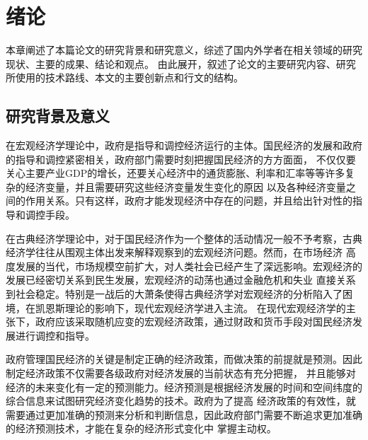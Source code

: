 \section{绪论}
本章阐述了本篇论文的研究背景和研究意义，综述了国内外学者在相关领域的研究现状、主要的成果、结论和观点。
由此展开，叙述了论文的主要研究内容、研究所使用的技术路线、本文的主要创新点和行文的结构。

\subsection{研究背景及意义}
在宏观经济学理论中，政府是指导和调控经济运行的主体。国民经济的发展和政府的指导和调控紧密相关，政府部门需要时刻把握国民经济的方方面面，
不仅仅要关心主要产业GDP的增长，还要关心经济中的通货膨胀、利率和汇率等等许多复杂的经济变量，并且需要研究这些经济变量发生变化的原因
以及各种经济变量之间的作用关系。只有这样，政府才能发现经济中存在的问题，并且给出针对性的指导和调控手段。

在古典经济学理论中，对于国民经济作为一个整体的活动情况一般不予考察，古典经济学往往从围观主体出发来解释观察到的宏观经济问题。然而，在市场经济
高度发展的当代，市场规模空前扩大，对人类社会已经产生了深远影响。宏观经济的发展已经密切关系到民生发展，宏观经济的动荡也通过金融危机和失业
直接关系到社会稳定。特别是一战后的大萧条使得古典经济学对宏观经济的分析陷入了困境，在凯恩斯理论的影响下，现代宏观经济学进入主流。
在现代宏观经济学的主张下，政府应该采取随机应变的宏观经济政策，通过财政和货币手段对国民经济发展进行调控和指导。

政府管理国民经济的关键是制定正确的经济政策，而做决策的前提就是预测。因此制定经济政策不仅需要各级政府对经济发展的当前状态有充分把握，
并且能够对经济的未来变化有一定的预测能力。经济预测是根据经济发展的时间和空间纬度的综合信息来试图研究经济变化趋势的技术。政府为了提高
经济政策的有效性，就需要通过更加准确的预测来分析和判断信息，因此政府部门需要不断追求更加准确的经济预测技术，才能在复杂的经济形式变化中
掌握主动权。

